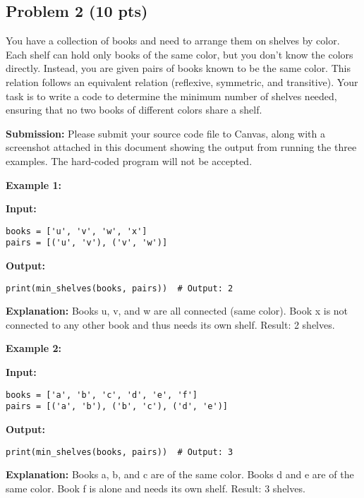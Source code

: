 \documentclass[12pt]{article}
\begin{document}
\begin{enumerate}
\subsection*{Problem 2 (10 pts)}
You have a collection of books and need to arrange them on shelves by color. Each shelf can hold only books of the same color, but you don't know the colors directly. Instead, you are given pairs of books known to be the same color. This relation follows an equivalent relation (reflexive, symmetric, and transitive). Your task is to write a code to determine the minimum number of shelves needed, ensuring that no two books of different colors share a shelf.

\noindent \textbf{Submission:} Please submit your source code file to Canvas, along with a screenshot attached in this document showing the output from running the three examples. The hard-coded program will not be accepted.
\vspace{1em}  %

\noindent \textbf{Example 1:}

\noindent \textbf{Input:}
\begin{verbatim}
books = ['u', 'v', 'w', 'x']
pairs = [('u', 'v'), ('v', 'w')]
\end{verbatim}

\noindent \textbf{Output:}
\begin{verbatim}
print(min_shelves(books, pairs))  # Output: 2
\end{verbatim}

\noindent \textbf{Explanation:} Books u, v, and w are all connected (same color). Book x is not connected to any other book and thus needs its own shelf.  
Result: 2 shelves.
\vspace{1em}  %

\noindent \textbf{Example 2:}

\noindent \textbf{Input:}
\begin{verbatim}
books = ['a', 'b', 'c', 'd', 'e', 'f']
pairs = [('a', 'b'), ('b', 'c'), ('d', 'e')]
\end{verbatim}

\noindent \textbf{Output:}
\begin{verbatim}
print(min_shelves(books, pairs))  # Output: 3
\end{verbatim}

\noindent \textbf{Explanation:} Books a, b, and c are of the same color. Books d and e are of the same color. Book f is alone and needs its own shelf.  
Result: 3 shelves.


\end{enumerate}
\end{document}
